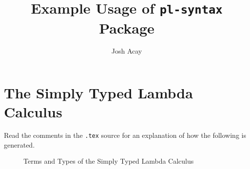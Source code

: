 \documentclass{article}
\title{Example Usage of \texttt{pl-syntax} Package}
\author{Josh Acay}
\begin{document}
\maketitle

\section{The Simply Typed Lambda Calculus}

Read the comments in the \texttt{.tex} source for an explanation of how
the following is generated.

\begin{figure}[h]
  \begin{syntax}
    


    \separate

    \category[Types]{\tau}

    \category[Contexts]{\Gamma}
  \end{syntax}

  \caption{Terms and Types of the Simply Typed Lambda Calculus}
  \label{fig:abstract-syntax}
\end{figure}  
\end{document}
